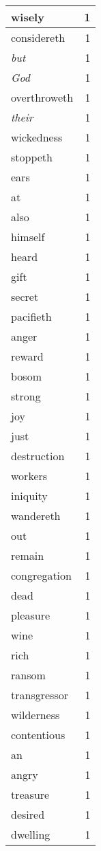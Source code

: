 \begin{center}
\begin{longtable}{l|r}
wisely & 1\\ \hline 
considereth & 1\\ \hline 
\emph{but} & 1\\ \hline 
\emph{God} & 1\\ \hline 
overthroweth & 1\\ \hline 
\emph{their} & 1\\ \hline 
wickedness & 1\\ \hline 
stoppeth & 1\\ \hline 
ears & 1\\ \hline 
at & 1\\ \hline 
also & 1\\ \hline 
himself & 1\\ \hline 
heard & 1\\ \hline 
gift & 1\\ \hline 
secret & 1\\ \hline 
pacifieth & 1\\ \hline 
anger & 1\\ \hline 
reward & 1\\ \hline 
bosom & 1\\ \hline 
strong & 1\\ \hline 
joy & 1\\ \hline 
just & 1\\ \hline 
destruction & 1\\ \hline 
workers & 1\\ \hline 
iniquity & 1\\ \hline 
wandereth & 1\\ \hline 
out & 1\\ \hline 
remain & 1\\ \hline 
congregation & 1\\ \hline 
dead & 1\\ \hline 
pleasure & 1\\ \hline 
wine & 1\\ \hline 
rich & 1\\ \hline 
ransom & 1\\ \hline 
transgressor & 1\\ \hline 
wilderness & 1\\ \hline 
contentious & 1\\ \hline 
an & 1\\ \hline 
angry & 1\\ \hline 
treasure & 1\\ \hline 
desired & 1\\ \hline 
dwelling & 1\\ \hline 

\end{longtable}
\end{center}
